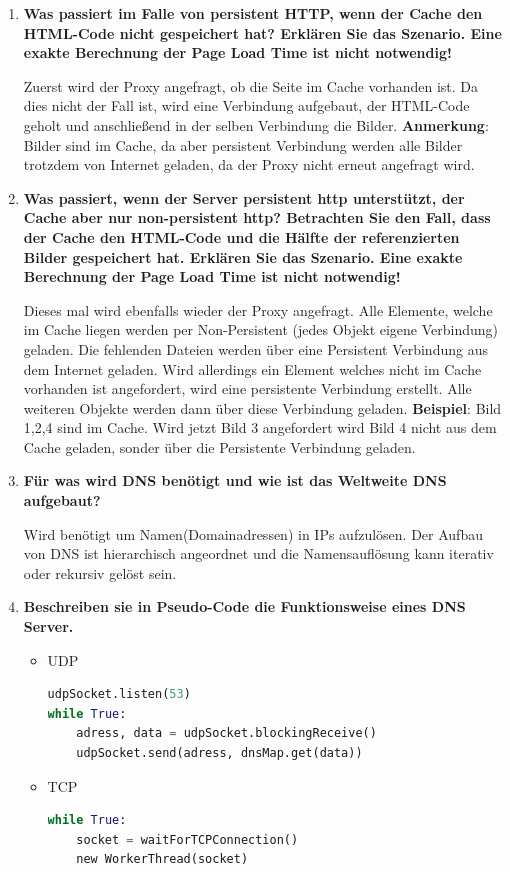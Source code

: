 \documentclass{article}
\begin{document}
\begin{enumerate}
	\item \textbf{Was passiert im Falle von persistent HTTP, wenn der Cache den HTML-Code nicht gespeichert hat? Erklären Sie das Szenario. Eine exakte Berechnung der Page Load Time ist nicht notwendig!}
	\begin{flushleft}
		Zuerst wird der Proxy angefragt, ob die Seite im Cache vorhanden ist. Da dies nicht der Fall ist, wird eine Verbindung aufgebaut, der HTML-Code geholt und anschließend in der selben Verbindung die Bilder.\linebreak
		\textbf{Anmerkung}: Bilder sind im Cache, da aber persistent Verbindung werden alle Bilder trotzdem von Internet geladen, da der Proxy nicht erneut angefragt wird.
	\end{flushleft}
	\item \textbf{Was passiert, wenn der Server persistent http unterstützt, der Cache aber nur non-persistent http? Betrachten Sie den Fall, dass der Cache den HTML-Code und die Hälfte der referenzierten Bilder gespeichert hat. Erklären Sie das Szenario. Eine exakte Berechnung der Page Load Time ist nicht notwendig!}
	\begin{flushleft}
		Dieses mal wird ebenfalls wieder der Proxy angefragt. Alle Elemente, welche im Cache liegen werden per Non-Persistent (jedes Objekt eigene Verbindung) geladen. Die fehlenden Dateien werden über eine Persistent Verbindung aus dem Internet geladen. Wird allerdings ein Element welches nicht im Cache vorhanden ist angefordert, wird eine persistente Verbindung erstellt. Alle weiteren Objekte werden dann über diese Verbindung geladen.\linebreak
		\textbf{Beispiel}: Bild 1,2,4 sind im Cache. Wird jetzt Bild 3 angefordert wird Bild 4 nicht aus dem Cache geladen, sonder über die Persistente Verbindung geladen.
	\end{flushleft}
	
	\item \textbf{Für was wird DNS benötigt und wie ist das Weltweite DNS aufgebaut?}
	\begin{flushleft}
		Wird benötigt um Namen(Domainadressen) in IPs aufzulösen. Der Aufbau von DNS ist hierarchisch angeordnet und die Namensauflösung kann iterativ oder rekursiv gelöst sein.
	\end{flushleft}
	
	\item \textbf{Beschreiben sie in Pseudo-Code die Funktionsweise eines DNS Server.}
	\begin{itemize}
		\item UDP
		\begin{lstlisting}[language=Python]
udpSocket.listen(53)
while True:
	adress, data = udpSocket.blockingReceive()
	udpSocket.send(adress, dnsMap.get(data))
		\end{lstlisting}
	\item TCP
		\begin{lstlisting}[language=Python]
while True:
	socket = waitForTCPConnection()
	new WorkerThread(socket)
	

\end{lstlisting}
\end{itemize}
\end{enumerate}
\end{document}
